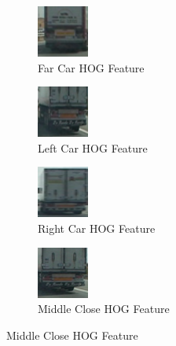 \documentclass[conference]{IEEEtran}
\begin{document}
\begin{figure}[h]
	\centering
	\begin{subfigure}[t]{0.2\textwidth} 
		\centering
		\includegraphics[scale=0.8]{figures/image0104.png}
		\caption{Far Car HOG Feature}
	\end{subfigure}%
	\begin{subfigure}[t]{0.2\textwidth} 
		\centering
		\includegraphics[scale=0.8]{figures/image0032.png}
		\caption{Left Car HOG Feature}
	\end{subfigure}
	\begin{subfigure}[t]{0.2\textwidth} 
		\centering
		\includegraphics[scale=0.8]{figures/image0038.png}
		\caption{Right Car HOG Feature}
	\end{subfigure} 
	\begin{subfigure}[t]{0.2\textwidth} 
		\centering
		\includegraphics[scale=0.8]{figures/image0026.png}
		\caption{Middle Close HOG Feature}
	\end{subfigure}%
\end{figure}
\end{document}
